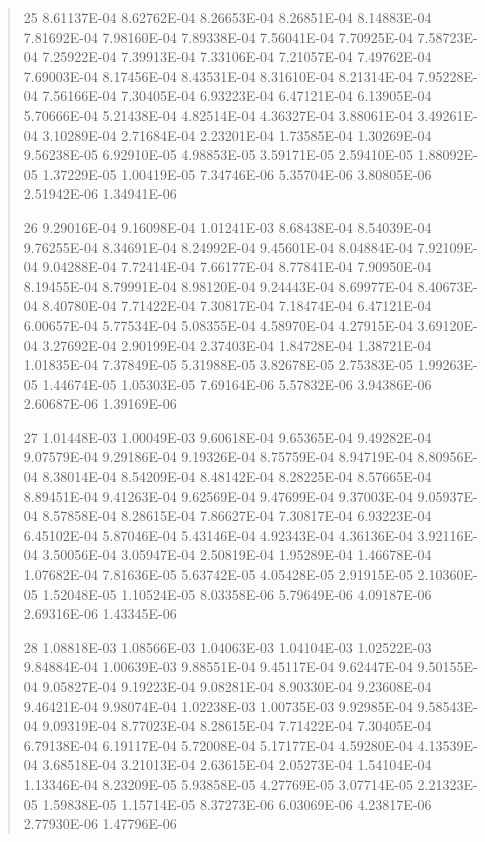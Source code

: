 \documentclass[letterpaper,10pt,english]{sphinxmanual}
\begin{document}
\begin{quote}
\begin{DUlineblock}{0em}
\item[] 25   8.61137E-04  8.62762E-04  8.26653E-04  8.26851E-04  8.14883E-04  7.81692E-04  7.98160E-04  7.89338E-04  7.56041E-04  7.70925E-04  7.58723E-04  7.25922E-04  7.39913E-04  7.33106E-04  7.21057E-04  7.49762E-04  7.69003E-04  8.17456E-04  8.43531E-04  8.31610E-04  8.21314E-04  7.95228E-04  7.56166E-04  7.30405E-04  6.93223E-04  6.47121E-04  6.13905E-04  5.70666E-04  5.21438E-04  4.82514E-04  4.36327E-04  3.88061E-04  3.49261E-04  3.10289E-04  2.71684E-04  2.23201E-04  1.73585E-04  1.30269E-04  9.56238E-05  6.92910E-05  4.98853E-05  3.59171E-05  2.59410E-05  1.88092E-05  1.37229E-05  1.00419E-05  7.34746E-06  5.35704E-06  3.80805E-06  2.51942E-06  1.34941E-06
\item[] 26   9.29016E-04  9.16098E-04  1.01241E-03  8.68438E-04  8.54039E-04  9.76255E-04  8.34691E-04  8.24992E-04  9.45601E-04  8.04884E-04  7.92109E-04  9.04288E-04  7.72414E-04  7.66177E-04  8.77841E-04  7.90950E-04  8.19455E-04  8.79991E-04  8.98120E-04  9.24443E-04  8.69977E-04  8.40673E-04  8.40780E-04  7.71422E-04  7.30817E-04  7.18474E-04  6.47121E-04  6.00657E-04  5.77534E-04  5.08355E-04  4.58970E-04  4.27915E-04  3.69120E-04  3.27692E-04  2.90199E-04  2.37403E-04  1.84728E-04  1.38721E-04  1.01835E-04  7.37849E-05  5.31988E-05  3.82678E-05  2.75383E-05  1.99263E-05  1.44674E-05  1.05303E-05  7.69164E-06  5.57832E-06  3.94386E-06  2.60687E-06  1.39169E-06
\item[] 27   1.01448E-03  1.00049E-03  9.60618E-04  9.65365E-04  9.49282E-04  9.07579E-04  9.29186E-04  9.19326E-04  8.75759E-04  8.94719E-04  8.80956E-04  8.38014E-04  8.54209E-04  8.48142E-04  8.28225E-04  8.57665E-04  8.89451E-04  9.41263E-04  9.62569E-04  9.47699E-04  9.37003E-04  9.05937E-04  8.57858E-04  8.28615E-04  7.86627E-04  7.30817E-04  6.93223E-04  6.45102E-04  5.87046E-04  5.43146E-04  4.92343E-04  4.36136E-04  3.92116E-04  3.50056E-04  3.05947E-04  2.50819E-04  1.95289E-04  1.46678E-04  1.07682E-04  7.81636E-05  5.63742E-05  4.05428E-05  2.91915E-05  2.10360E-05  1.52048E-05  1.10524E-05  8.03358E-06  5.79649E-06  4.09187E-06  2.69316E-06  1.43345E-06
\item[] 28   1.08818E-03  1.08566E-03  1.04063E-03  1.04104E-03  1.02522E-03  9.84884E-04  1.00639E-03  9.88551E-04  9.45117E-04  9.62447E-04  9.50155E-04  9.05827E-04  9.19223E-04  9.08281E-04  8.90330E-04  9.23608E-04  9.46421E-04  9.98074E-04  1.02238E-03  1.00735E-03  9.92985E-04  9.58543E-04  9.09319E-04  8.77023E-04  8.28615E-04  7.71422E-04  7.30405E-04  6.79138E-04  6.19117E-04  5.72008E-04  5.17177E-04  4.59280E-04  4.13539E-04  3.68518E-04  3.21013E-04  2.63615E-04  2.05273E-04  1.54104E-04  1.13346E-04  8.23209E-05  5.93858E-05  4.27769E-05  3.07714E-05  2.21323E-05  1.59838E-05  1.15714E-05  8.37273E-06  6.03069E-06  4.23817E-06  2.77930E-06  1.47796E-06

\end{DUlineblock}
\end{quote}
\end{document}

